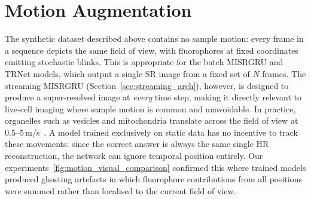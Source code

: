 


\section{Motion Augmentation}
\label{sec:motion_augment}


The synthetic dataset described above contains no sample motion: every frame in a
sequence depicts the same field of view, with fluorophores at fixed coordinates
emitting stochastic blinks.
This is appropriate for the batch MISRGRU and TRNet models, which output a single
SR image from a fixed set of $N$ frames.
The streaming MISRGRU (Section~\ref{sec:streaming_arch}), however, is designed to
produce a super-resolved image at \emph{every} time step, making it directly
relevant to live-cell imaging where sample motion is common and unavoidable.
In practice, organelles such as vesicles and mitochondria translate across the
field of view at 0.5--5\,\textmu m/s~\cite{tang2013fast}.
A model trained exclusively on static data has no incentive to track these
movements: since the correct answer is always the same single HR reconstruction,
the network can ignore temporal position entirely.
Our experiments~\ref{fig:motion_visual_comparison} confirmed this where trained models produced
ghosting artefacts in which fluorophore contributions from all positions were
summed rather than localised to the current field of view.


